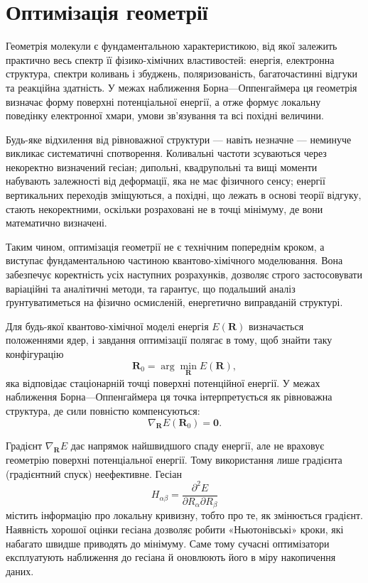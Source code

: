 
\section{Оптимізація геометрії}

Геометрія молекули є фундаментальною характеристикою, від якої залежить практично весь спектр її фізико-хімічних властивостей: енергія, електронна структура, спектри коливань і збуджень, поляризованість, багаточастинні відгуки та реакційна здатність. У межах наближення Борна---Оппенгаймера ця геометрія визначає форму поверхні потенціальної енергії, а отже формує локальну поведінку електронної хмари, умови зв'язування та всі похідні величини.

Будь-яке відхилення від рівноважної структури --- навіть незначне --- неминуче викликає систематичні спотворення. Коливальні частоти зсуваються через некоректно визначений гесіан; дипольні, квадрупольні та вищі моменти набувають залежності від деформації, яка не має фізичного сенсу; енергії вертикальних переходів зміщуються, а похідні, що лежать в основі теорії відгуку, стають некоректними, оскільки розраховані не в точці мінімуму, де вони математично визначені.

Таким чином, оптимізація геометрії не є технічним попереднім кроком, а виступає фундаментальною частиною квантово-хімічного моделювання. Вона забезпечує коректність усіх наступних розрахунків, дозволяє строго застосовувати варіаційні та аналітичні методи, та гарантує, що подальший аналіз ґрунтуватиметься на фізично осмисленій, енергетично виправданій структурі.




Для будь-якої квантово-хімічної моделі енергія $E(\mathbf R)$ визначається положеннями ядер, і завдання оптимізації полягає в тому, щоб знайти таку конфігурацію
\[
\mathbf R_0 = \arg\min_{\mathbf R} E(\mathbf R),
\]
яка відповідає стаціонарній точці поверхні потенційної енергії. У межах наближення Борна---Оппенгаймера ця точка інтерпретується як рівноважна структура, де сили повністю компенсуються:
\[
\nabla_{\mathbf R} E(\mathbf R_0) = \mathbf 0.
\]

Градієнт $\nabla_{\mathbf R} E$ дає напрямок найшвидшого спаду енергії, але не враховує геометрію поверхні потенціальної енергії. Тому використання лише градієнта (градієнтний спуск) неефективне. Гесіан
\[
H_{\alpha\beta}=\frac{\partial^2E}{\partial R_\alpha\partial R_\beta}
\]
містить інформацію про локальну кривизну, тобто про те, як змінюється градієнт. Наявність хорошої оцінки гесіана дозволяє робити «Ньютонівські» кроки, які набагато швидше приводять до мінімуму. Саме тому сучасні оптимізатори експлуатують наближення до гесіана й оновлюють його в міру накопичення даних.

